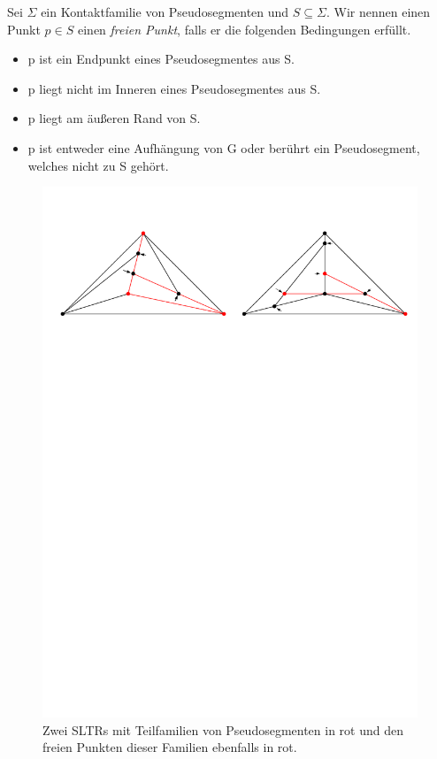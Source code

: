 \begin{definition}
Sei $\Sigma$ ein Kontaktfamilie von Pseudosegmenten und $S\subseteq\Sigma$. Wir nennen einen Punkt $p\in S$ einen \textit{freien Punkt}, falls er die folgenden Bedingungen erfüllt.
\begin{itemize}
\item p ist ein Endpunkt eines Pseudosegmentes aus S.
\item p liegt nicht im Inneren eines Pseudosegmentes aus S.
\item p liegt am äußeren Rand von S.
\item p ist entweder eine Aufhängung von G oder berührt ein Pseudosegment, welches nicht zu S gehört.
\end{itemize} 
\end{definition}

\begin{figure}[h]
	\centering
  \includegraphics[width=1\textwidth]{exp_free.pdf}
  \caption{Zwei SLTRs mit Teilfamilien von Pseudosegmenten in rot und den freien Punkten dieser Familien ebenfalls in rot.}
\end{figure}

